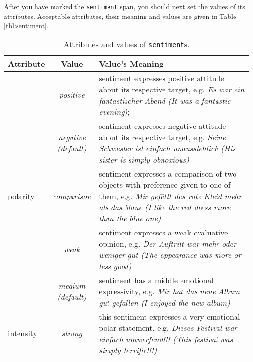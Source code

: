 \documentclass[11pt,a4paper]{article}
\newlength{\clmnwidth}
\theoremstyle{mytheoremstyle}
\begin{document}
After you have marked the \texttt{sentiment} span, you should next set
the values of its attributes.  Acceptable attributes, their meaning
and values are given in Table \ref{tbl:sentiment}.
\begin{center}
  \begin{table}[ht]
    \caption{Attributes and values of \texttt{sentiment}s.}
    \begin{tabular}{|l|c|p{\clmnwidth}|}\hline
      Attribute & Value & Value's Meaning\\\hline

      & \textit{positive} & sentiment expresses positive attitude about
      its respective target, e.g. \textit{Es war ein fantastischer Abend
        (It was a fantastic evening)};\\\cline{2-3}

      & \textit{negative\newline(default)} & sentiment expresses
      negative attitude about its respective target, e.g. \textit{Seine
        Schwester ist einfach unausstehlich (His sister is simply
        obnoxious)}\\\cline{2-3}

      \multirow{-3}{*}{polarity} & \textit{comparison} & sentiment
      expresses a comparison of two objects with preference given to one
      of them, e.g. \textit{Mir gef\"allt das rote Kleid mehr als das
        blaue (I like the red dress more than the blue one)}\\\hline


      & \textit{weak} & sentiment expresses a weak evaluative opinion,
      e.g. \textit{Der Auftritt war mehr oder weniger gut (The
        appearance was more or less good)}\\\cline{2-3}

      & \textit{medium\newline(default)} & sentiment has a middle
      emotional expressivity, e.g. \textit{Mir hat das neue Album gut
        gefallen (I enjoyed the new album)}\\\cline{2-3}

      \multirow{-3}{*}{intensity} & \textit{strong} & this sentiment
      expresses a very emotional polar statement, e.g. \textit{Dieses
        Festival war einfach umwerfend!!! (This festival was simply
        terrific!!!)}\\\hline


\end{tabular}
\end{table}
\end{center}
\end{document}
